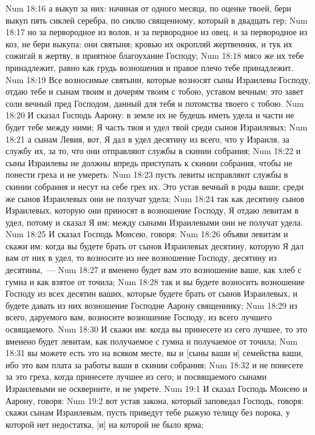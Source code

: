 \vs Num 18:16 а выкуп за них: начиная от одного месяца, по оценке твоей, бери выкуп пять сиклей серебра, по сиклю священному, который в двадцать гер;
\vs Num 18:17 но за первородное из волов, и за первородное из овец, и за первородное из коз, не бери выкупа: они святыня; кровью их окропляй жертвенник, и тук их сожигай в жертву, в приятное благоухание Господу;
\vs Num 18:18 мясо же их тебе принадлежит, равно как грудь возношения и правое плечо тебе принадлежит.
\vs Num 18:19 Все возносимые святыни, которые возносят сыны Израилевы Господу, отдаю тебе и сынам твоим и дочерям твоим с тобою, уставом вечным; это завет соли вечный пред Господом, данный для тебя и потомства твоего с тобою.
\rsbpar\vs Num 18:20 И сказал Господь Аарону: в земле их не будешь иметь удела и части не будет тебе между ними; Я часть твоя и удел твой среди сынов Израилевых;
\vs Num 18:21 а сынам Левия, вот, Я дал в удел десятину из всего, что у Израиля, за службу их, за то, что они отправляют службы в скинии собрания;
\vs Num 18:22 и сыны Израилевы не должны впредь приступать к скинии собрания, чтобы не понести греха и не умереть:
\vs Num 18:23 пусть левиты исправляют службы в скинии собрания и несут на себе грех их. Это устав вечный в роды ваши; среди же сынов Израилевых они не получат удела;
\vs Num 18:24 так как десятину сынов Израилевых, которую они приносят в возношение Господу, Я отдаю левитам в удел, потому и сказал Я им: между сынами Израилевыми они не получат удела.
\rsbpar\vs Num 18:25 И сказал Господь Моисею, говоря:
\vs Num 18:26 объяви левитам и скажи им: когда вы будете брать от сынов Израилевых десятину, которую Я дал вам от них в удел, то возносите из нее возношение Господу, десятину из десятины,~---
\vs Num 18:27 и вменено будет вам это возношение ваше, как хлеб с гумна и как взятое от точила;
\vs Num 18:28 так и вы будете возносить возношение Господу из всех десятин ваших, которые будете брать от сынов Израилевых, и будете давать из них возношение Господне Аарону священнику;
\vs Num 18:29 из всего, даруемого вам, возносите возношение Господу, из всего лучшего освящаемого.
\vs Num 18:30 И скажи им: когда вы принесете из сего лучшее, то это вменено будет левитам, как получаемое с гумна и получаемое от точила;
\vs Num 18:31 вы можете есть это на всяком месте, вы и [сыны ваши и] семейства ваши, ибо это вам плата за работы ваши в скинии собрания;
\vs Num 18:32 и не понесете за это греха, когда принесете лучшее из сего; и посвящаемого сынами Израилевыми не оскверните, и не умрете.
\vs Num 19:1 И сказал Господь Моисею и Аарону, говоря:
\vs Num 19:2 вот устав закона, который заповедал Господь, говоря: скажи сынам Израилевым, пусть приведут тебе рыжую телицу без порока, у которой нет недостатка, [и] на которой не было ярма;
